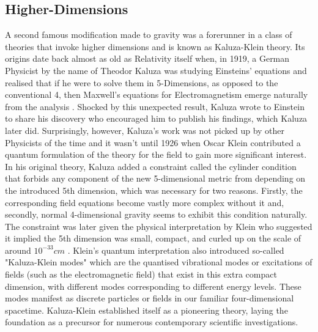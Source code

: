 \documentclass[11pt]{report}
\numberwithin{equation}{chapter}
\begin{document}
\subsection{Higher-Dimensions}
A second famous modification made to gravity was a forerunner in a class of theories that invoke higher dimensions and is known as Kaluza-Klein theory. Its origins date back almost as old as Relativity itself when, in 1919, a German Physicist by the name of Theodor Kaluza was studying Einsteins' equations and realised that if he were to solve them in 5-Dimensions, as opposed to the conventional 4, then Maxwell's equations for Electromagnetism emerge naturally from the analysis \cite{1921SPAW.......966K}. Shocked by this unexpected result, Kaluza wrote to Einstein to share his discovery who encouraged him to publish his findings, which Kaluza later did. Surprisingly, however, Kaluza's work was not picked up by other Physicists of the time and it wasn't until 1926 when Oscar Klein contributed a quantum formulation of the theory for the field to gain more significant interest. In his original theory, Kaluza added a constraint called the cylinder condition that forbids any component of the new 5-dimensional metric from depending on the introduced 5th dimension, which was necessary for two reasons. Firstly, the corresponding field equations become vastly more complex without it and, secondly, normal 4-dimensional gravity seems to exhibit this condition naturally. The constraint was later given the physical interpretation by Klein who suggested it implied the 5th dimension was small, compact, and curled up on the scale of around $10^{-33}cm$ \cite{Klein1926TheAO}. Klein's quantum interpretation also introduced so-called "Kaluza-Klein modes" which are the quantised vibrational modes or excitations of fields (such as the electromagnetic field) that exist in this extra compact dimension, with different modes corresponding to different energy levels. These modes manifest as discrete particles or fields in our familiar four-dimensional spacetime. Kaluza-Klein established itself as a pioneering theory, laying the foundation as a precursor for numerous contemporary scientific investigations.\\
\end{document}
